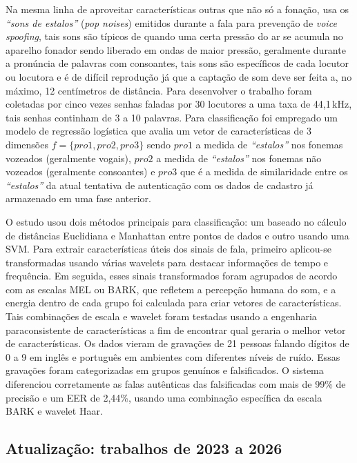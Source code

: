 			\par Na mesma linha de aproveitar características outras que não só a fonação,  usa os \textit{``sons de estalos''} (\textit{pop noises}) emitidos durante a fala para prevenção de \textit{voice spoofing}, tais sons são típicos de quando uma certa pressão do ar se acumula no aparelho fonador sendo liberado em ondas de maior pressão, geralmente durante a pronúncia de palavras com consoantes, tais sons são específicos de cada locutor ou locutora e é de difícil reprodução já que a captação de som deve ser feita a, no máximo, 12 centímetros de distância. Para desenvolver o trabalho foram coletadas por cinco vezes senhas faladas por 30 locutores a uma taxa de 44,1\,kHz, tais senhas continham de 3 a 10 palavras. Para classificação foi empregado um modelo de regressão logística que avalia um vetor de características de 3 dimensões $f=\{pro1, pro2, pro3\}$ sendo $pro1$ a medida de \textit{``estalos''} nos fonemas vozeados (geralmente vogais), $pro2$ a medida de \textit{``estalos''} nos fonemas não vozeados (geralmente consoantes) e $pro3$ que é a medida de similaridade entre os \textit{``estalos''} da atual tentativa de autenticação com os dados de cadastro já armazenado em uma fase anterior.
			
			\par O estudo \cite{furlan2021caracterizacao} usou dois métodos principais para classificação: um baseado no cálculo de distâncias Euclidiana e Manhattan entre pontos de dados e outro usando uma SVM. Para extrair características úteis dos sinais de fala, primeiro aplicou-se transformadas usando várias wavelets para destacar informações de tempo e frequência. Em seguida, esses sinais transformados foram agrupados de acordo com as escalas MEL ou BARK, que refletem a percepção humana do som, e a energia dentro de cada grupo foi calculada para criar vetores de características. Tais combinações de escala e wavelet foram testadas usando a engenharia paraconsistente de características a fim de encontrar qual geraria o melhor vetor de características. Os dados vieram de gravações de 21 pessoas falando dígitos de 0 a 9 em inglês e português em ambientes com diferentes níveis de ruído. Essas gravações foram categorizadas em grupos genuínos e falsificados. O sistema diferenciou corretamente as falas autênticas das falsificadas com mais de 99\% de precisão e um \ac{EER} de 2,44\%, usando uma combinação específica da escala BARK e wavelet Haar.

			\subsection{Atualização: trabalhos de 2023 a 2026}
			\label{sec:atualizacao2026}

